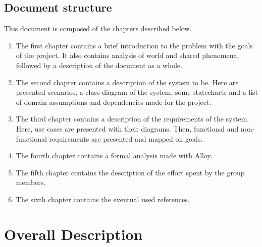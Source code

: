 \documentclass[a4paper, 11pt, titlepage]{article}
\begin{document}
\subsection{Document structure}
This document is composed of the chapters described below.
\begin{enumerate}
    \item The first chapter contains a brief introduction to the problem with the goals of the project.
It also contains analysis of world and shared phenomena, followed by a description of the
document as a whole.
    \item The second chapter contains a description of the system to be. Here are presented scenarios, a
class diagram of the system, some statecharts and a list of domain assumptions and dependencies
made for the project.
    \item The third chapter contains a description of the requirements of the system. Here, use cases are
presented with their diagrams. Then, functional and non-functional requirements are presented
and mapped on goals.
    \item The fourth chapter contains a formal analysis made with Alloy.
    \item The fifth chapter contains the description of the effort spent by the group members.
    \item The sixth chapter contains the eventual used references.
\end{enumerate}

\newpage



\section{Overall Description}
\end{document}
